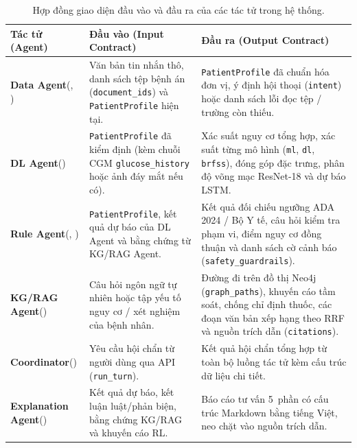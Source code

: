\begin{table}[H]
\centering
\caption{Hợp đồng giao diện đầu vào và đầu ra của các tác tử trong hệ thống.}
\label{tab:agent-interfaces}
\small
\begin{tabularx}{\linewidth}{@{}L{3.3cm}L{4.2cm}Y@{}}
\toprule
\textbf{Tác tử (Agent)} & \textbf{Đầu vào (Input Contract)} & \textbf{Đầu ra (Output Contract)} \\
\midrule
\textbf{Data Agent}\newline (, ) &
Văn bản tin nhắn thô, danh sách tệp bệnh án (\texttt{document\_ids}) và \texttt{PatientProfile} hiện tại. &
\texttt{PatientProfile} đã chuẩn hóa đơn vị, ý định hội thoại (\texttt{intent}) hoặc danh sách lỗi đọc tệp / trường còn thiếu. \\
\addlinespace[3pt]
\textbf{DL Agent}\newline () &
\texttt{PatientProfile} đã kiểm định (kèm chuỗi CGM \texttt{glucose\_history} hoặc ảnh đáy mắt nếu có). &
Xác suất nguy cơ tổng hợp, xác suất từng mô hình (\texttt{ml}, \texttt{dl}, \texttt{brfss}), đóng góp đặc trưng, phân độ võng mạc ResNet-18 và dự báo LSTM. \\
\addlinespace[3pt]
\textbf{Rule Agent}\newline (, ) &
\texttt{PatientProfile}, kết quả dự báo của DL Agent và bằng chứng từ KG/RAG Agent. &
Kết quả đối chiếu ngưỡng ADA 2024 / Bộ Y tế, câu hỏi kiểm tra phạm vi, điểm nguy cơ đồng thuận và danh sách cờ cảnh báo (\texttt{safety\_guardrails}). \\
\addlinespace[3pt]
\textbf{KG/RAG Agent}\newline () &
Câu hỏi ngôn ngữ tự nhiên hoặc tập yếu tố nguy cơ / xét nghiệm của bệnh nhân. &
Đường đi trên đồ thị Neo4j (\texttt{graph\_paths}), khuyến cáo tầm soát, chống chỉ định thuốc, các đoạn văn bản xếp hạng theo RRF và nguồn trích dẫn (\texttt{citations}). \\
\addlinespace[3pt]
\textbf{Coordinator}\newline () &
Yêu cầu hội chẩn từ người dùng qua API (\texttt{run\_turn}). &
Kết quả hội chẩn tổng hợp từ toàn bộ luồng tác tử kèm cấu trúc dữ liệu chi tiết. \\
\addlinespace[3pt]
\textbf{Explanation Agent}\newline () &
Kết quả dự báo, kết luận luật/phản biện, bằng chứng KG/RAG và khuyến cáo RL. &
Báo cáo tư vấn 5~phần có cấu trúc Markdown bằng tiếng Việt, neo chặt vào nguồn trích dẫn. \\

\end{tabularx}
\end{table}
